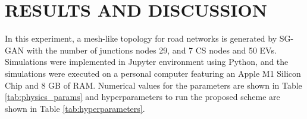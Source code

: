 \documentclass[journal, a4paper, twocolumn]{IEEEtran}
\begin{document}
\setcounter{section}{5}

\section{RESULTS AND DISCUSSION}
\label{sec:results}

In this experiment, a mesh-like topology for road networks is generated by SG-GAN with the number of junctions nodes 29, and 7 CS nodes and 50 EVs. Simulations were implemented in Jupyter environment using Python, and the simulations were executed on a personal computer featuring an Apple M1 Silicon Chip and 8 GB of RAM. Numerical values for the parameters are shown in Table \ref{tab:physics_params} and hyperparameters to run the proposed scheme are shown in Table \ref{tab:hyperparameters}.

\begin{table}[htbp]
\centering
\caption{Parameters Related to Energy Calculation}
\label{tab:physics_params}
\end{table}
\end{document}
